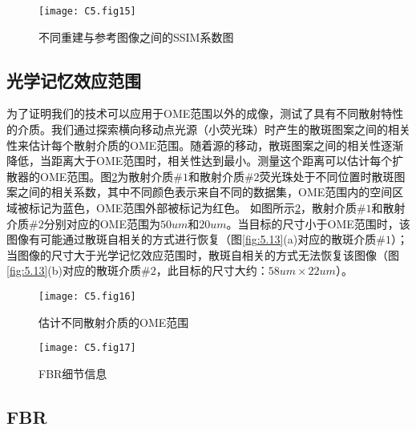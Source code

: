 \begin{figure}[htp]
	\centering
	\texttt{[image: C5.fig15]}
	\caption{不同重建与参考图像之间的SSIM系数图}
	\label{fig:5.15}
\end{figure}

\subsection{光学记忆效应范围}

为了证明我们的技术可以应用于OME范围以外的成像，测试了具有不同散射特性的介质。我们通过探索横向移动点光源（小荧光珠）时产生的散斑图案之间的相关性来估计每个散射介质的OME范围。随着源的移动，散斑图案之间的相关性逐渐降低，当距离大于OME范围时，相关性达到最小。测量这个距离可以估计每个扩散器的OME范围。图\ref{fig:5.16}为散射介质$\# 1$和散射介质$\# 2$荧光珠处于不同位置时散斑图案之间的相关系数，其中不同颜色表示来自不同的数据集，OME范围内的空间区域被标记为蓝色，OME范围外部被标记为红色。
如图所示\ref{fig:5.16}，散射介质$\# 1$和散射介质$\# 2$分别对应的OME范围为$50 um$和$20 um$。当目标的尺寸小于OME范围时，该图像有可能通过散斑自相关的方式进行恢复（图\ref{fig:5.13}(a)对应的散斑介质$\# 1$）；当图像的尺寸大于光学记忆效应范围时，散斑自相关的方式无法恢复该图像（图\ref{fig:5.13}(b)对应的散斑介质$\# 2$，此目标的尺寸大约：$ 58 um \times 22 um $）。

\begin{figure}[htp]
	\centering
	\texttt{[image: C5.fig16]}
	\caption{估计不同散射介质的OME范围}
	\label{fig:5.16}
\end{figure}

\begin{figure}[htp]
	\centering
	\texttt{[image: C5.fig17]}
	\caption{FBR细节信息}
	\label{fig:5.17}
\end{figure}

\subsection{FBR}

